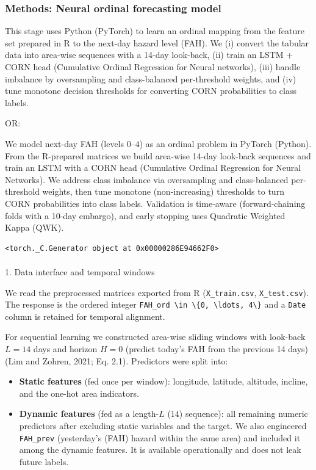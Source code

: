 \documentclass[
  letterpaper,
  DIV=11,
  numbers=noendperiod]{scrartcl}
\makeatletter
\let\oldparagraph\paragraph
\renewcommand{\paragraph}{
    \@ifstar
      \xxxParagraphStar
      \xxxParagraphNoStar
  }
\newcommand{\xxxParagraphStar}[1]{\oldparagraph*{#1}\mbox{}}
\newcommand{\xxxParagraphNoStar}[1]{\oldparagraph{#1}\mbox{}}
\providecommand{\tightlist}{%
  \setlength{\itemsep}{0pt}\setlength{\parskip}{0pt}}\usepackage{longtable,booktabs,array}
\makeatother
\begin{document}
\subsubsection{Methods: Neural ordinal forecasting
model}\label{methods-neural-ordinal-forecasting-model}

This stage uses Python (PyTorch) to learn an ordinal mapping from the
feature set prepared in R to the next-day hazard level (FAH). We (i)
convert the tabular data into area-wise sequences with a 14-day
look-back, (ii) train an LSTM + CORN head (Cumulative Ordinal Regression
for Neural networks), (iii) handle imbalance by oversampling and
class-balanced per-threshold weights, and (iv) tune monotone decision
thresholds for converting CORN probabilities to class labels.

OR:

We model next-day FAH (levels \(0\)--\(4\)) as an ordinal problem in
PyTorch (Python). From the R-prepared matrices we build area-wise 14-day
look-back sequences and train an LSTM with a CORN head (Cumulative
Ordinal Regression for Neural Networks). We address class imbalance via
oversampling and class-balanced per-threshold weights, then tune
monotone (non-increasing) thresholds to turn CORN probabilities into
class labels. Validation is time-aware (forward-chaining folds with a
10-day embargo), and early stopping uses Quadratic Weighted Kappa (QWK).

\begin{verbatim}
<torch._C.Generator object at 0x00000286E94662F0>
\end{verbatim}

\paragraph{1. Data interface and temporal
windows}\label{data-interface-and-temporal-windows}

We read the preprocessed matrices exported from R
(\texttt{X\_train.csv}, \texttt{X\_test.csv}). The response is the
ordered integer
\texttt{FAH\_ord\ \textbackslash{}in\ \textbackslash{}\{0,\ \textbackslash{}ldots,\ 4\textbackslash{}\}}
and a \texttt{Date} column is retained for temporal alignment.

For sequential learning we constructed area-wise sliding windows with
look-back \(L = 14\) days and horizon \(H = 0\) (predict today's FAH
from the previous 14 days) (Lim and Zohren, 2021; Eq. 2.1). Predictors
were split into:

\begin{itemize}
\tightlist
\item
  \textbf{Static features} (fed once per window): longitude, latitude,
  altitude, incline, and the one-hot area indicators.\\
\item
  \textbf{Dynamic features} (fed as a length-\(L\) (\(14\)) sequence):
  all remaining numeric predictors after excluding static variables and
  the target. We also engineered \texttt{FAH\_prev} (yesterday's (FAH)
  hazard within the same area) and included it among the dynamic
  features. It is available operationally and does not leak future
  labels.\\
\end{itemize}
\end{document}
